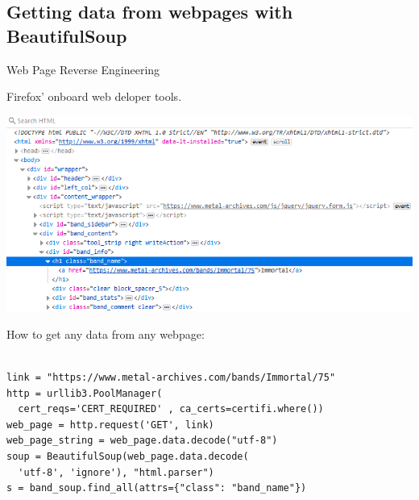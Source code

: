 \documentclass{beamer}
\begin{document}
  \subsection{Getting data from webpages with BeautifulSoup}
  
    \begin{frame}{Web Page Reverse Engineering}
    
      Firefox' onboard web deloper tools.
    
      \begin{center}
        \includegraphics[scale=.6]{firefox_dom}
      \end{center}
    
    \end{frame}   
    
    \begin{frame}[fragile]

How to get any data from any webpage:

\begin{lstlisting}[basicstyle=\footnotesize,]

link = "https://www.metal-archives.com/bands/Immortal/75"
http = urllib3.PoolManager(
  cert_reqs='CERT_REQUIRED' , ca_certs=certifi.where())
web_page = http.request('GET', link)
web_page_string = web_page.data.decode("utf-8")
soup = BeautifulSoup(web_page.data.decode(
  'utf-8', 'ignore'), "html.parser")
s = band_soup.find_all(attrs={"class": "band_name"})

\end{lstlisting}

    \end{frame}
\end{document}
